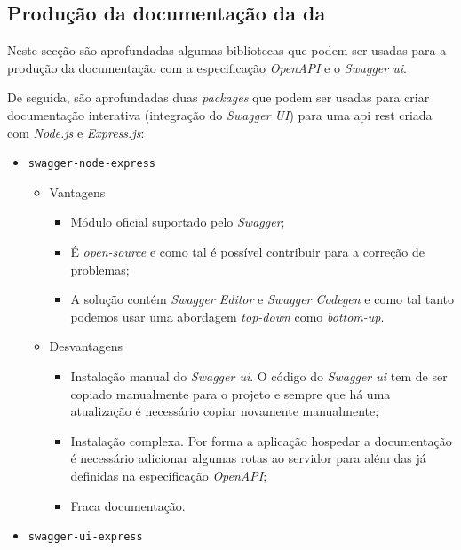\subsection{Produção da documentação da  da }\label{sec:soaDocAPI}

Neste secção são aprofundadas algumas bibliotecas que podem ser usadas para a produção da documentação com a 
especificação \textit{OpenAPI} e o \textit{Swagger \acrshort{ui}}. 

De seguida, são aprofundadas duas \textit{packages} que podem ser usadas para criar documentação 
interativa (integração do \textit{Swagger UI}) para uma \acrshort{api} \acrshort{rest} criada com 
\textit{Node.js} e \textit{Express.js}:~\cite{swaggerNode}
\begin{itemize}
    \item \texttt{swagger-node-express}
    \begin{itemize}
        \item Vantagens
        \begin{itemize}
            \item Módulo oficial suportado pelo \textit{Swagger};
            \item É \textit{open-source} e como tal é possível contribuir para a correção de problemas;
            \item A solução contém \textit{Swagger Editor} e \textit{Swagger Codegen} e como tal tanto 
            podemos usar uma abordagem \textit{top-down} como \textit{bottom-up}.
        \end{itemize}
        \item Desvantagens
        \begin{itemize}
            \item Instalação manual do \textit{Swagger \acrshort{ui}}. O código do \textit{Swagger \acrshort{ui}} 
            tem de ser copiado manualmente para o projeto e sempre que há uma atualização é necessário copiar 
            novamente manualmente;
            \item Instalação complexa. Por forma a aplicação hospedar a documentação é necessário adicionar 
            algumas rotas ao servidor para além das já definidas na especificação \textit{OpenAPI};
            \item Fraca documentação.
        \end{itemize}
    \end{itemize}
    \item \texttt{swagger-ui-express}

\end{itemize}
